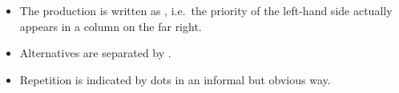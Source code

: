 \begin{isabellebody}
\begin{isamarkuptext}
\begin{itemize}
  \item The production  is written as , i.e.\ the priority of the left-hand side actually appears in
  a column on the far right.

  \item Alternatives are separated by .

  \item Repetition is indicated by dots  in an informal
  but obvious way.

  \end{itemize}


\end{isamarkuptext}
\end{isabellebody}
